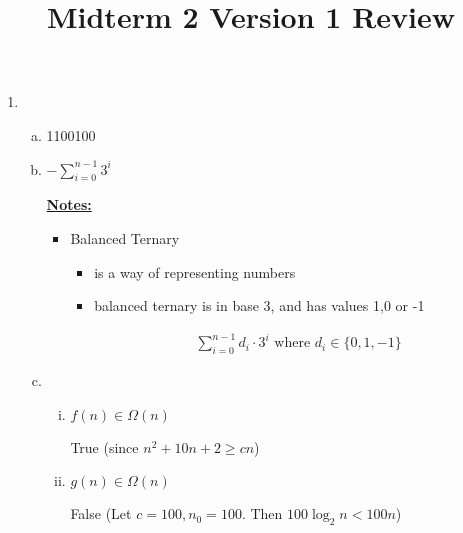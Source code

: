 \documentclass[12pt]{article}
\begin{document}
\title{Midterm 2 Version 1 Review}
\maketitle

\begin{enumerate}[1.]
    \item

    \begin{enumerate}[a)]
        \item 1100100
        \item $- \sum\limits_{i=0}^{n-1} 3^i$

        \bigskip

        \underline{\textbf{Notes:}}

        \bigskip

        \begin{itemize}
            \item Balanced Ternary

            \begin{itemize}
                \item is a way of representing numbers
                \item balanced ternary is in base 3, and has values 1,0 or -1

                \bigskip

                \begin{align}
                    \sum\limits_{i=0}^{n-1} d_i \cdot 3^i \text{ where $d_i \in \{0,1,-1\}$}
                \end{align}
            \end{itemize}
        \end{itemize}

        \item

        \begin{enumerate}[i.]
            \item \underline{$f(n) \in \Omega(n)$}

            \bigskip

            True (since $n^2 + 10n + 2 \geq cn$)

            \bigskip

            \item \underline{$g(n) \in \Omega(n)$}

            \bigskip

            False (Let $c = 100, n_0 = 100$. Then $100 \log_2 n < 100 n$)


\end{enumerate}
\end{enumerate}
\end{enumerate}
\end{document}
